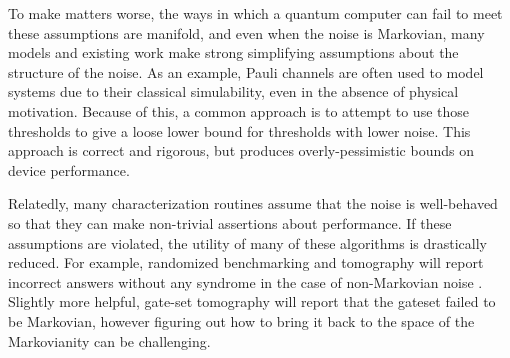 \documentclass[aps,nofootinbib,pra,notitlepage,twocolumn]{revtex4-1}
\begin{document}
To make matters worse, the ways in which a quantum computer can fail to meet these assumptions are manifold\cite{Kelly2018, BlumeKohout2017, Klimov2018}, and even when the noise is Markovian, many models and existing work make strong simplifying assumptions about the structure of the noise. As an example, Pauli channels are often used to model systems due to their classical simulability\cite{quant-ph/9807006}, even in the absence of physical motivation\cite{Aliferis2007, Knill2005, Wang2011, DuclosCianci2010, Wootton2012, Bombin2012, Puzzuoli2014, aliferis2008accuracy}. Because of this, a common approach is to attempt to use those thresholds to give a loose lower bound for thresholds with lower noise\cite{Puzzuoli2014}. This approach is correct and rigorous, but produces overly-pessimistic bounds on device performance.

Relatedly, many characterization routines assume that the noise is well-behaved so that they can make non-trivial assertions about performance. If these assumptions are violated, the utility of many of these algorithms is drastically reduced. For example, randomized benchmarking and tomography will report incorrect answers without any syndrome in the case of non-Markovian noise \cite{Merkel2013}. Slightly more helpful, gate-set tomography will report that the gateset failed to be Markovian, however figuring out how to bring it back to the space of the Markovianity can be challenging.
\end{document}
